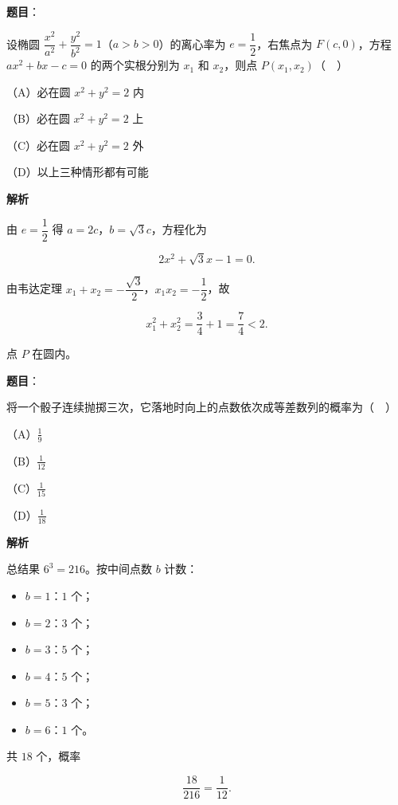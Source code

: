 \begin{answer}

\textbf{题目}：

设椭圆 $\dfrac{x^2}{a^2}+\dfrac{y^2}{b^2}=1$（$a>b>0$）的离心率为 $e=\dfrac12$，右焦点为 $F(c,0)$，方程 $ax^2+bx-c=0$ 的两个实根分别为 $x_1$ 和 $x_2$，则点 $P(x_1,x_2)$（　）

（A）必在圆 $x^2+y^2=2$ 内

（B）必在圆 $x^2+y^2=2$ 上

（C）必在圆 $x^2+y^2=2$ 外

（D）以上三种情形都有可能

\textbf{解析}

由 $e=\dfrac12$ 得 $a=2c$，$b=\sqrt3c$，方程化为

\nopagebreak[4]
\[2x^2+\sqrt3x-1=0.\]

由韦达定理 $x_1+x_2=-\dfrac{\sqrt3}{2}$，$x_1x_2=-\dfrac12$，故

\nopagebreak[4]
\[x_1^2+x_2^2=\frac34+1=\frac74<2.\]

点 $P$ 在圆内。


\end{answer}
\begin{answer}

\textbf{题目}：

将一个骰子连续抛掷三次，它落地时向上的点数依次成等差数列的概率为（　）

（A）$\frac19$

（B）$\frac1{12}$

（C）$\frac1{15}$

（D）$\frac1{18}$

\textbf{解析}

总结果 $6^3=216$。按中间点数 $b$ 计数：

\begin{itemize}
\item $b=1$：$1$ 个；
\item $b=2$：$3$ 个；
\item $b=3$：$5$ 个；
\item $b=4$：$5$ 个；
\item $b=5$：$3$ 个；
\item $b=6$：$1$ 个。
\end{itemize}

共 $18$ 个，概率

\nopagebreak[4]
\[\frac{18}{216}=\frac1{12}.\]


\end{answer}
